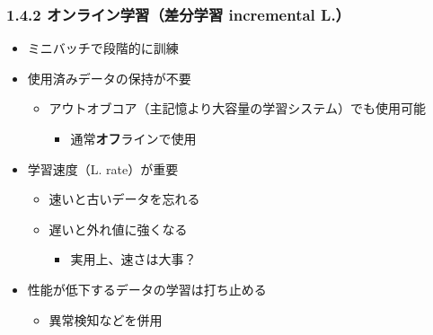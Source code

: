 \documentclass[aspectratio=169, dvipdfmx, 14pt, xcolor={svgnames,dvipsnames}]{beamer}
\def\tightlist{\itemsep1pt\parskip0pt\parsep0pt}
\begin{document}

\begin{frame}
  \frametitle{1.4.2 オンライン学習（差分学習 incremental L.）}


  \begin{itemize}
    \tightlist
    \item
          ミニバッチで段階的に訓練
    \item
          使用済みデータの保持が不要

          \begin{itemize}
            \tightlist
            \item
                  アウトオブコア（主記憶より大容量の学習システム）でも使用可能

                  \begin{itemize}
                    \tightlist
                    \item
                          通常\textbf{オフ}ラインで使用
                  \end{itemize}
          \end{itemize}
    \item
          学習速度（L. rate）が重要

          \begin{itemize}
            \tightlist
            \item
                  速いと古いデータを忘れる
            \item
                  遅いと外れ値に強くなる

                  \begin{itemize}
                    \tightlist
                    \item
                          実用上、速さは大事？
                  \end{itemize}
          \end{itemize}
    \item
          性能が低下するデータの学習は打ち止める

          \begin{itemize}
            \tightlist
            \item
                  異常検知などを併用
          \end{itemize}
  \end{itemize}
\end{frame}

\end{document}
